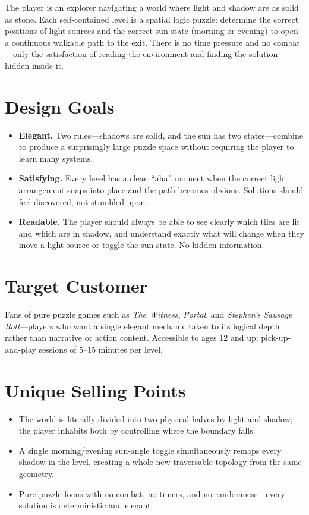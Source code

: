 \documentclass[11pt, letterpaper]{article}
\begin{document}
The player is an explorer navigating a world where light and shadow are as solid as stone. Each
self-contained level is a spatial logic puzzle: determine the correct positions of light sources and
the correct sun state (morning or evening) to open a continuous walkable path to the exit. There is
no time pressure and no combat---only the satisfaction of reading the environment and finding the
solution hidden inside it.

\section*{Design Goals}

\begin{itemize}[leftmargin=1.5em, itemsep=2pt]
    \item \textbf{Elegant.} Two rules---shadows are solid, and the sun has two states---combine to
    produce a surprisingly large puzzle space without requiring the player to learn many systems.
    \item \textbf{Satisfying.} Every level has a clean ``aha'' moment when the correct light
    arrangement snaps into place and the path becomes obvious. Solutions should feel discovered,
    not stumbled upon.
    \item \textbf{Readable.} The player should always be able to see clearly which tiles are lit
    and which are in shadow, and understand exactly what will change when they move a light source
    or toggle the sun state. No hidden information.
\end{itemize}

\section*{Target Customer}

Fans of pure puzzle games such as \textit{The Witness}, \textit{Portal}, and \textit{Stephen's
Sausage Roll}---players who want a single elegant mechanic taken to its logical depth rather than
narrative or action content. Accessible to ages 12 and up; pick-up-and-play sessions of 5--15
minutes per level.

\section*{Unique Selling Points}

\begin{itemize}[leftmargin=1.5em, itemsep=2pt]
    \item The world is literally divided into two physical halves by light and shadow; the player
    inhabits both by controlling where the boundary falls.
    \item A single morning/evening sun-angle toggle simultaneously remaps every shadow in the
    level, creating a whole new traversable topology from the same geometry.
    \item Pure puzzle focus with no combat, no timers, and no randomness---every solution is
    deterministic and elegant.
\end{itemize}
\end{document}
